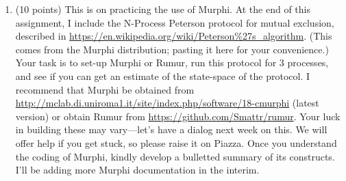 \documentclass[11pt]{article}
\begin{document}
\begin{enumerate}
  
\item (10 points)
  This is on practicing the use of Murphi.
  At the end of this assignment, I include the N-Process Peterson protocol
  for mutual exclusion, described in
  \url{https://en.wikipedia.org/wiki/Peterson\%27s_algorithm}.
  (This comes from the Murphi distribution; pasting it here for your
  convenience.)
  Your task is to set-up Murphi or Rumur, run this protocol for 3 processes, and
  see if you can get an estimate of the state-space of the protocol.
  I recommend that Murphi be obtained from
  \url{http://mclab.di.uniroma1.it/site/index.php/software/18-cmurphi} (latest version)
  or obtain Rumur from
  \url{https://github.com/Smattr/rumur}.
  Your luck in building these may vary---let's have a dialog next week on this.
  We will offer help if you get stuck, so please raise it on Piazza.
  Once you understand the coding of Murphi, kindly develop a bulletted summary of its
  constructs.
  I'll be adding more Murphi documentation in the interim.


\begin{minipage}{\minpagw}
\end{minipage}  


\end{enumerate}
\end{document}
